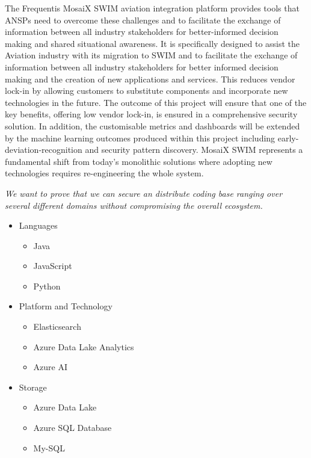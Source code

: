 \begin{Workpackage}{\thewpno}
\begin{Task}
The Frequentis MosaiX SWIM aviation integration platform provides tools that ANSPs need to overcome these challenges and to facilitate the exchange of information between all industry stakeholders for better-informed decision making and shared situational awareness. It is specifically designed to assist the Aviation industry with its migration to SWIM and to facilitate the exchange of information between all industry stakeholders for better informed decision making and the creation of new applications and services. This reduces vendor lock-in by allowing customers to substitute components and incorporate new technologies in the future. The outcome of this project will ensure that one of the key benefits, offering low vendor lock-in, is ensured in a comprehensive security solution.
In addition, the customisable metrics and dashboards will be extended by the machine learning outcomes produced within this project including early-deviation-recognition and security pattern discovery. MosaiX SWIM represents a fundamental shift from today’s monolithic solutions where adopting new technologies requires re-engineering the whole system.

\emph{We want to prove that we can secure an distribute coding base ranging over several different domains without compromising the overall ecosystem.}

\begin{itemize}
    \item Languages
        \begin{itemize}
            \item Java
            \item JavaScript
			\item Python
        \end{itemize}
    \item Platform and Technology
        \begin{itemize}
            \item Elasticsearch
            \item Azure Data Lake Analytics
            \item Azure AI
        \end{itemize}
    \item Storage
        \begin{itemize}
            \item Azure Data Lake
			\item Azure SQL Database
            \item My-SQL
        \end{itemize}
\end{itemize}


\end{Task}
\end{Workpackage}
